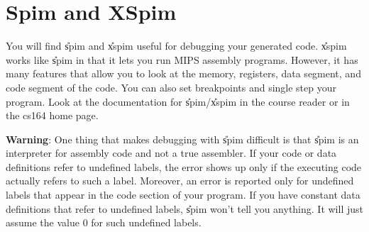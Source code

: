 \section{Spim and XSpim}
You will find \U{spim} and \U{xspim} useful for debugging your generated code.
\U{xspim} works like \U{spim} in that it lets you run MIPS
assembly programs. However, it has many features that allow you to
look at the memory, registers, data segment, and code segment of the
code. You can also set breakpoints and single step your program.
Look at the documentation for \U{spim}/\U{xspim} in the course reader
or in the cs164 home page.

{\bf Warning}: One thing that makes debugging with \U{spim} difficult
is that \U{spim} is an interpreter for assembly code and not a true assembler.
If your code or data definitions refer to undefined labels,
the error shows up only if the executing code actually refers to
such a label. Moreover, an error is reported only for undefined
labels that appear in the code section of your program. If you have
constant data definitions that refer to undefined labels, \U{spim} won't
tell you anything. It will just assume the value 0 for such undefined
labels.



